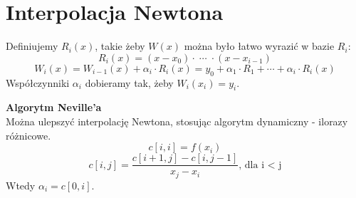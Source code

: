 \section{Interpolacja Newtona}
Definiujemy \( R_i(x) \), takie żeby \( W(x) \) można było łatwo wyrazić w bazie \( R_i \):
\[
    R_i(x) = (x - x_0) \cdot \;\cdots\; \cdot (x - x_{i-1})
\]
\[
    W_i(x) = W_{i-1}(x) + \alpha_i \cdot R_i(x) = y_0 + \alpha_1 \cdot R_1 + \cdots + \alpha_i \cdot R_i(x)
\]
Współczynniki \( \alpha_i \) dobieramy tak, żeby \( W_i(x_i) = y_i \).

\noindent
\textbf{Algorytm Neville'a} \\
Można ulepszyć interpolację Newtona, stosując algorytm dynamiczny - ilorazy różnicowe.
\[
    c[i, i] = f(x_i)
\]
\[
    c[i, j] = \frac{c[i + 1, j] - c[i, j - 1]}{x_j - x_i} \text{, dla i < j}
\]
Wtedy \( \alpha_i = c[0, i] \).